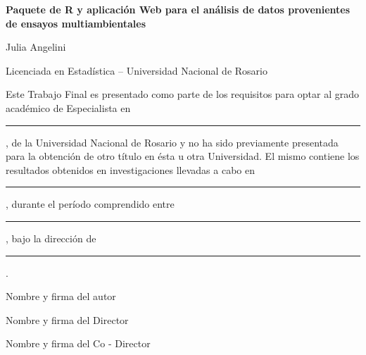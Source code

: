 
\thispagestyle{empty}
\begin{center}
\textbf{\Large{Paquete de R y aplicación Web para el análisis de datos provenientes de ensayos multiambientales}}
\end{center}

\vspace{1.5cm}

\begin{center}
Julia Angelini

\vspace{0.5cm}
Licenciada en Estadística – Universidad Nacional de Rosario
\end{center}
\vspace{1.5cm}
Este Trabajo Final es presentado como parte de los requisitos para optar al grado académico de Especialista en \rule{4cm}{0.4pt}, de la Universidad Nacional de Rosario y no ha sido previamente presentada para la obtención de otro título en ésta u otra Universidad. El mismo contiene los resultados obtenidos en investigaciones llevadas a cabo en \rule{4cm}{0.4pt}, durante el período comprendido entre \rule{4cm}{0.4pt}, bajo la dirección de\rule{6cm}{0.4pt}.  

\vspace{1.25cm}
Nombre y firma del autor

\vspace{1.25cm}
Nombre y firma del Director
 
\vspace{1.25cm}
Nombre y firma del Co - Director

\vspace{2.5cm}



